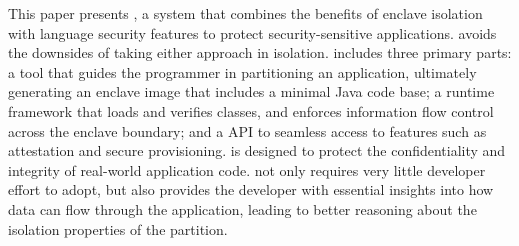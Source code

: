 This paper presents {\em \systemname{}},
a system that combines the benefits of
 \sgx{} enclave isolation with \java{} language security features to protect security-sensitive applications.
\systemname{} avoids the downsides of taking either approach in isolation.
\systemname{} includes three primary parts:
a tool that guides the programmer in partitioning an application, ultimately generating an enclave image that includes
a minimal Java code base;
a runtime framework that loads and verifies classes, and enforces
information flow control across the enclave boundary;
and a \java{} API to seamless access to \sgx{} features such
as attestation and secure provisioning.
\systemname{} is designed to protect the confidentiality and integrity of 
real-world application code. 
\systemname{} not only requires very little developer effort to adopt, but also provides the developer
with essential insights into how data can flow through the application,
leading to better reasoning about the isolation properties of the partition.

